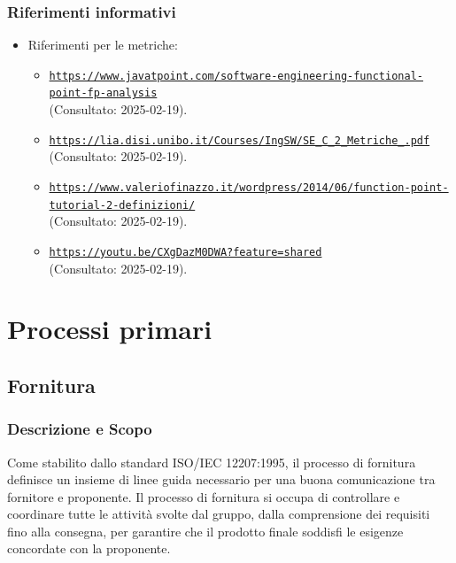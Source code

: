 \documentclass[10pt]{article}
\begin{document}
\begin{justify}
        \subsubsection{Riferimenti informativi}
        \begin{itemize}
            \item Riferimenti per le metriche: 
            \begin{itemize}
                \item \textcolor{blue}{\texttt{\url{https://www.javatpoint.com/software-engineering-functional-point-fp-analysis}}}\\
              (Consultato: 2025-02-19).\\
                \item \textcolor{blue}{\texttt{\url{https://lia.disi.unibo.it/Courses/IngSW/SE_C_2_Metriche_.pdf}}}\\
              (Consultato: 2025-02-19).\\
                \item \textcolor{blue}{\texttt{\url{https://www.valeriofinazzo.it/wordpress/2014/06/function-point-tutorial-2-definizioni/}}}\\
              (Consultato: 2025-02-19).\\
                \item \textcolor{blue}{\texttt{\url{https://youtu.be/CXgDazM0DWA?feature=shared}}}\\
              (Consultato: 2025-02-19).
            \end{itemize}
        \end{itemize}

\newpage
\section{Processi primari}
    \subsection{Fornitura}

    \subsubsection{Descrizione e Scopo}
    Come stabilito dallo standard ISO/IEC 12207:1995, il processo di fornitura definisce un insieme di linee guida necessario per una buona comunicazione tra fornitore e proponente. Il processo di fornitura si occupa di controllare e coordinare tutte le attività svolte dal gruppo, dalla comprensione dei requisiti fino alla consegna, per garantire che il prodotto finale soddisfi le esigenze concordate con la proponente.\\


\end{justify}
\end{document}
